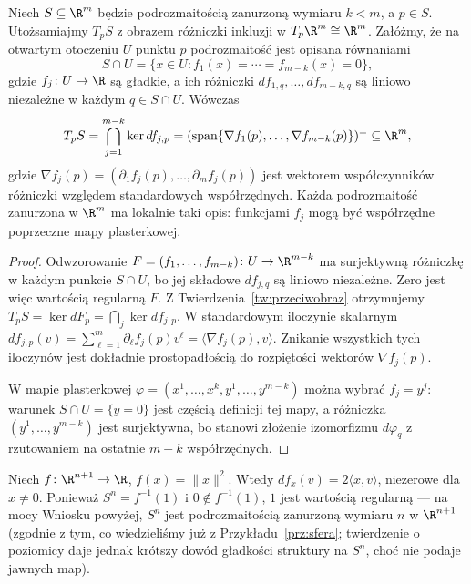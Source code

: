 \begin{stwierdzenie}
\label{stw:styczna-normalne-euklidesowe}
Niech $S\subseteq\R^m$ będzie podrozmaitością zanurzoną wymiaru
$k<m$, a $p\in S$. Utożsamiajmy $T_pS$ z obrazem różniczki inkluzji
w $T_p\R^m\cong\R^m$. Załóżmy, że na otwartym otoczeniu $U$ punktu $p$
podrozmaitość jest opisana równaniami
\[
S\cap U=\{x\in U:f_1(x)=\cdots=f_{m-k}(x)=0\},
\]
gdzie $f_j\colon U\to\R$ są gładkie, a ich różniczki
$df_{1,q},\ldots,df_{m-k,q}$ są liniowo niezależne w każdym
$q\in S\cap U$. Wówczas
\[
T_pS=\bigcap_{j=1}^{m-k}\ker df_{j,p}
=\left(\operatorname{span}\{\nabla f_1(p),\ldots,
\nabla f_{m-k}(p)\}\right)^\perp\subseteq\R^m,
\]
gdzie $\nabla f_j(p)=
(\partial_1f_j(p),\ldots,\partial_mf_j(p))$ jest wektorem
współczynników różniczki względem standardowych współrzędnych.
Każda podrozmaitość zanurzona w $\R^m$ ma lokalnie taki opis:
funkcjami $f_j$ mogą być współrzędne poprzeczne mapy plasterkowej.
\end{stwierdzenie}
\begin{proof}
Odwzorowanie $F=(f_1,\ldots,f_{m-k})\colon U\to\R^{m-k}$
ma surjektywną różniczkę w każdym punkcie $S\cap U$,
bo jej składowe $df_{j,q}$ są liniowo niezależne. Zero jest więc
wartością regularną $F$. Z Twierdzenia~\ref{tw:przeciwobraz}
otrzymujemy $T_pS=\ker dF_p=\bigcap_j\ker df_{j,p}$.
W standardowym iloczynie skalarnym
$df_{j,p}(v)=\sum_{\ell=1}^m\partial_\ell f_j(p)v^\ell
=\langle\nabla f_j(p),v\rangle$.
Znikanie wszystkich tych iloczynów jest dokładnie prostopadłością
do rozpiętości wektorów $\nabla f_j(p)$.

W mapie plasterkowej $\varphi=(x^1,\ldots,x^k,y^1,\ldots,y^{m-k})$
można wybrać $f_j=y^j$: warunek $S\cap U=\{y=0\}$ jest częścią
definicji tej mapy, a różniczka $(y^1,\ldots,y^{m-k})$ jest
surjektywna, bo stanowi złożenie izomorfizmu $d\varphi_q$
z rzutowaniem na ostatnie $m-k$ współrzędnych.
\end{proof}

\begin{przyklad}
Niech $f\colon\R^{n+1}\to\R$, $f(x)=\|x\|^2$. Wtedy $df_x(v)=2\langle x,v\rangle$, niezerowe
dla $x\neq0$. Ponieważ $S^n=f^{-1}(1)$ i $0\notin f^{-1}(1)$, $1$ jest wartością regularną
— na mocy Wniosku powyżej, $S^n$ jest podrozmaitością zanurzoną wymiaru $n$ w $\R^{n+1}$
(zgodnie z tym, co wiedzieliśmy już z Przykładu~\ref{prz:sfera}; twierdzenie o poziomicy
daje jednak krótszy dowód gładkości struktury na $S^n$, choć nie podaje jawnych map).
\end{przyklad}

